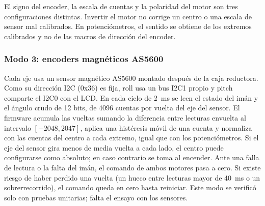 El signo del encoder, la escala de cuentas y la polaridad del motor son tres configuraciones distintas. Invertir el motor no corrige un centro o una escala de sensor mal calibrados. En potenciómetros, el sentido se obtiene de los extremos calibrados y no de las macros de dirección del encoder.

\subsubsection{Modo 3: encoders magnéticos AS5600}
Cada eje usa un sensor magnético AS5600 montado después de la caja reductora. Como su dirección I2C (0x36) es fija, roll usa un bus I2C1 propio y pitch comparte el I2C0 con el LCD. En cada ciclo de 2~ms se leen el estado del imán y el ángulo crudo de 12 bits, de 4096 cuentas por vuelta del eje del sensor. El firmware acumula las vueltas sumando la diferencia entre lecturas envuelta al intervalo $[-2048,2047]$, aplica una histéresis móvil de una cuenta y normaliza con las cuentas del centro a cada extremo, igual que con los potenciómetros. Si el eje del sensor gira menos de media vuelta a cada lado, el centro puede configurarse como absoluto; en caso contrario se toma al encender. Ante una falla de lectura o la falta del imán, el comando de ambos motores pasa a cero. Si existe riesgo de haber perdido una vuelta (un hueco entre lecturas mayor de 40~ms o un sobrerrecorrido), el comando queda en cero hasta reiniciar. Este modo se verificó solo con pruebas unitarias; falta el ensayo con los sensores.

